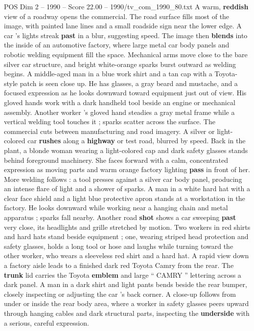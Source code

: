 \begin{textsample}{POS Dim 2 – 1990 – Score 22.00 – 1990/tv\_com\_1990\_80.txt}  \label{ex:f2_pos_034}
A warm, \textbf{reddish} view of a roadway opens the commercial.
The road surface fills most of the image, with painted lane lines and a small roadside sign near the lower edge.
A car ’s lights streak \textbf{past} in a blur, suggesting speed.
The image then \textbf{blends} into the inside of an automotive factory, where large metal car body panels and robotic welding equipment fill the space.
Mechanical arms move close to the bare silver car structure, and bright white-orange sparks burst outward as welding begins.
A middle-aged man in a blue work shirt and a tan cap with a Toyota-style patch is seen close up.
He has glasses, a gray beard and mustache, and a focused expression as he looks downward toward equipment just out of view.
His gloved hands work with a dark handheld tool beside an engine or mechanical assembly.
Another worker ’s gloved hand steadies a gray metal frame while a vertical welding tool touches it ; sparks scatter across the surface.
The commercial cuts between manufacturing and road imagery.
A silver or light-colored car \textbf{rushes} along a \textbf{highway} or test road, blurred by speed.
Back in the plant, a blonde woman wearing a light-colored cap and dark safety glasses stands behind foreground machinery.
She faces forward with a calm, concentrated expression as moving parts and warm orange factory lighting \textbf{pass} in front of her.
More welding follows : a tool presses against a silver car body panel, producing an intense flare of light and a shower of sparks.
A man in a white hard hat with a clear face shield and a light blue protective apron stands at a workstation in the factory.
He looks downward while working near a hanging chain and metal apparatus ; sparks fall nearby.
Another road \textbf{shot} shows a car sweeping \textbf{past} very close, its headlights and grille stretched by motion.
Two workers in red shirts and hard hats stand beside equipment ; one, wearing striped head protection and safety glasses, holds a long tool or hose and laughs while turning toward the other worker, who wears a sleeveless red shirt and a hard hat.
A rapid view down a factory aisle leads to a finished dark red Toyota Camry from the rear.
The \textbf{trunk} lid carries the Toyota \textbf{emblem} and large “ CAMRY ” lettering across a dark panel.
A man in a dark shirt and light pants bends beside the rear bumper, closely inspecting or adjusting the car ’s back corner.
A close-up follows from under or inside the rear body area, where a worker in safety glasses peers upward through hanging cables and dark structural parts, inspecting the \textbf{underside} with a serious, careful expression.

\end{textsample}
